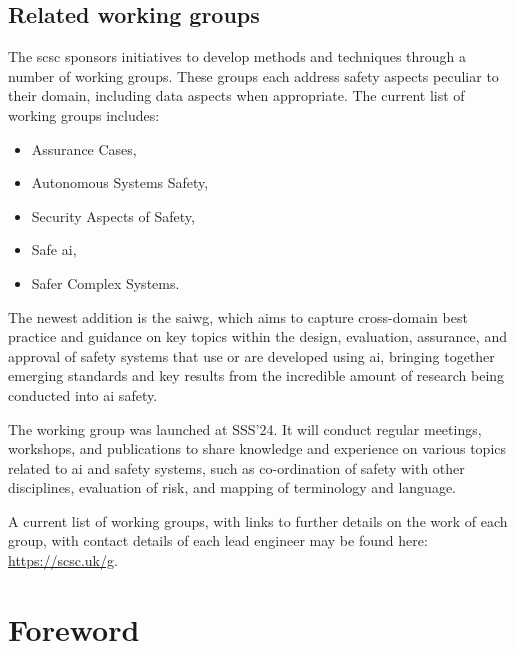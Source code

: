 \subsection*{Related working groups}
The \gls{scsc} sponsors initiatives to develop methods and techniques through a number of working groups. These groups each address safety aspects peculiar to their domain, including data aspects when appropriate. The current list of working groups includes:
%
\begin{itemize}
  \item Assurance Cases,
  \item Autonomous Systems Safety,
  \item Security Aspects of Safety,
  \item Safe \gls{ai},
  \item Safer Complex Systems. 
\end{itemize}
%
The newest addition is the \gls{saiwg}, which aims to capture cross-domain best practice and guidance on key topics within the design, evaluation, assurance, and approval of safety systems that use or are developed using \gls{ai}, bringing together emerging standards and key results from the incredible amount of research being conducted into \gls{ai} safety.

The working group was launched at SSS’24. It will conduct regular meetings, workshops, and publications to share knowledge and experience on various topics related to \gls{ai} and safety systems, such as co-ordination of safety with other disciplines, evaluation of risk, and mapping of terminology and language.

A current list of working groups, with links to further details on the work of each group, with contact details of each lead engineer may be found here: \href{https://scsc.uk/g}{https://scsc.uk/g}.
%
\clearpage
%

\makeatletter		%
\dsiwg@intblankpage
\makeatother

\pagestyle{FirstPageFrontMatter}
\section*{Foreword}


